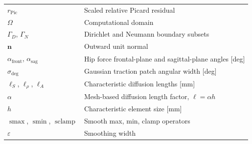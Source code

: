 {\begin{longtable}{@{} l p{} @{}}
$r_{\mathrm{Pic}}$ & Scaled relative Picard residual \\
$\Omega$ & Computational domain \\
$\Gamma_D$, $\Gamma_N$ & Dirichlet and Neumann boundary subsets \\
$\mathbf{n}$ & Outward unit normal \\
$\alpha_{\mathrm{front}}$, $\alpha_{\mathrm{sag}}$ & Hip force frontal-plane and sagittal-plane angles [deg] \\
$\sigma_{\deg}$ & Gaussian traction patch angular width [deg] \\
$\ell_S$, $\ell_\rho$, $\ell_A$ & Characteristic diffusion lengths [mm] \\
$\alpha$ & Mesh-based diffusion length factor, $\ell=\alpha h$ \\
$h$ & Characteristic element size [mm] \\
$\operatorname{smax}$, $\operatorname{smin}$, $\operatorname{sclamp}$ & Smooth max, min, clamp operators \\
$\varepsilon$ & Smoothing width \\
\end{longtable}
}
